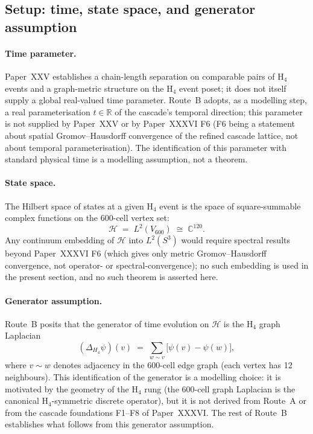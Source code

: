 \documentclass[12pt]{article}
\begin{document}
\subsection{Setup: time, state space, and generator assumption}

\paragraph{Time parameter.} Paper~XXV establishes a chain-length separation on comparable pairs of H${}_4$ events and a graph-metric structure on the H${}_4$ event poset; it does not itself supply a global real-valued time parameter. Route~B adopts, as a modelling step, a real parameterisation $t \in \mathbb{R}$ of the cascade's temporal direction; this parameter is not supplied by Paper~XXV or by Paper~XXXVI F6 (F6 being a statement about spatial Gromov--Hausdorff convergence of the refined cascade lattice, not about temporal parameterisation). The identification of this parameter with standard physical time is a modelling assumption, not a theorem.

\paragraph{State space.} The Hilbert space of states at a given H${}_4$ event is the space of square-summable complex functions on the 600-cell vertex set:
\begin{equation}
    \mathcal{H} \;=\; L^2(V_{600}) \;\cong\; \mathbb{C}^{120}.
\end{equation}
Any continuum embedding of $\mathcal{H}$ into $L^2(S^3)$ would require spectral results beyond Paper~XXXVI F6 (which gives only metric Gromov--Hausdorff convergence, not operator- or spectral-convergence); no such embedding is used in the present section, and no such theorem is asserted here.

\paragraph{Generator assumption.} Route~B posits that the generator of time evolution on $\mathcal{H}$ is the H${}_4$ graph Laplacian
\begin{equation}\label{eq:H4_laplacian}
    (\Delta_{H_4}\psi)(v) \;=\; \sum_{w \sim v}\bigl[\psi(v) - \psi(w)\bigr],
\end{equation}
where $v \sim w$ denotes adjacency in the 600-cell edge graph (each vertex has 12 neighbours). This identification of the generator is a modelling choice: it is motivated by the geometry of the H${}_4$ rung (the 600-cell graph Laplacian is the canonical H${}_4$-symmetric discrete operator), but it is not derived from Route~A or from the cascade foundations F1--F8 of Paper~XXXVI. The rest of Route~B establishes what follows from this generator assumption.
\end{document}
